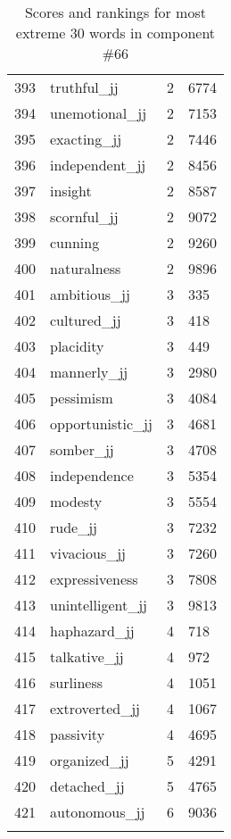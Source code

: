 \begin{longtable}[!htbp]{| rlr@{.}l |}
    393 & truthful\_jj & 2 & 6774 \\
    394 & unemotional\_jj & 2 & 7153 \\
    395 & exacting\_jj & 2 & 7446 \\
    396 & independent\_jj & 2 & 8456 \\
    397 & insight & 2 & 8587 \\
    398 & scornful\_jj & 2 & 9072 \\
    399 & cunning & 2 & 9260 \\
    400 & naturalness & 2 & 9896 \\
    401 & ambitious\_jj & 3 & 335 \\
    402 & cultured\_jj & 3 & 418 \\
    403 & placidity & 3 & 449 \\
    404 & mannerly\_jj & 3 & 2980 \\
    405 & pessimism & 3 & 4084 \\
    406 & opportunistic\_jj & 3 & 4681 \\
    407 & somber\_jj & 3 & 4708 \\
    408 & independence & 3 & 5354 \\
    409 & modesty & 3 & 5554 \\
    410 & rude\_jj & 3 & 7232 \\
    411 & vivacious\_jj & 3 & 7260 \\
    412 & expressiveness & 3 & 7808 \\
    413 & unintelligent\_jj & 3 & 9813 \\
    414 & haphazard\_jj & 4 & 718 \\
    415 & talkative\_jj & 4 & 972 \\
    416 & surliness & 4 & 1051 \\
    417 & extroverted\_jj & 4 & 1067 \\
    418 & passivity & 4 & 4695 \\
    419 & organized\_jj & 5 & 4291 \\
    420 & detached\_jj & 5 & 4765 \\
    421 & autonomous\_jj & 6 & 9036 \\
    \hline
    \caption{Scores and rankings for most extreme 30 words in component \#66} \\
\end{longtable}
